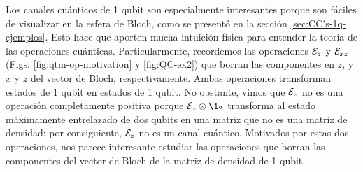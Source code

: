 Los canales cuánticos de 1 qubit son especialmente interesantes porque 
son fáciles de visualizar en la esfera de Bloch, como se presentó
en la sección \ref{sec:CC's-1q-ejemplos}. Esto hace que 
aporten mucha intuición física para entender la teoría de
las operaciones cuánticas. 
Particularmente, recordemos 
las operaciones $\mathcal{E}_z$ y $\mathcal{E}_{xz}$ (Figs. \ref{fig:qtm-op-motivation}
y \ref{fig:QC-ex2}) que borran las componentes en $z$, y 
$x$ y $z$ del vector de Bloch, respectivamente. Ambas operaciones
transforman estados de 1 qubit en estados de 1 qubit. No obstante, 
vimos que $\mathcal{E}_z$ no es una operación completamente positiva porque 
$\E_z\otimes\1 _2$ transforma al estado máximamente entrelazado de 
dos qubits en una matriz que no es una matriz de densidad;
por consiguiente, $\mathcal{E}_z$ no es un canal cuántico. 
Motivados por estas dos operaciones, nos parece interesante 
estudiar las operaciones que borran las componentes del 
vector de Bloch de la matriz de densidad de 1 qubit.

